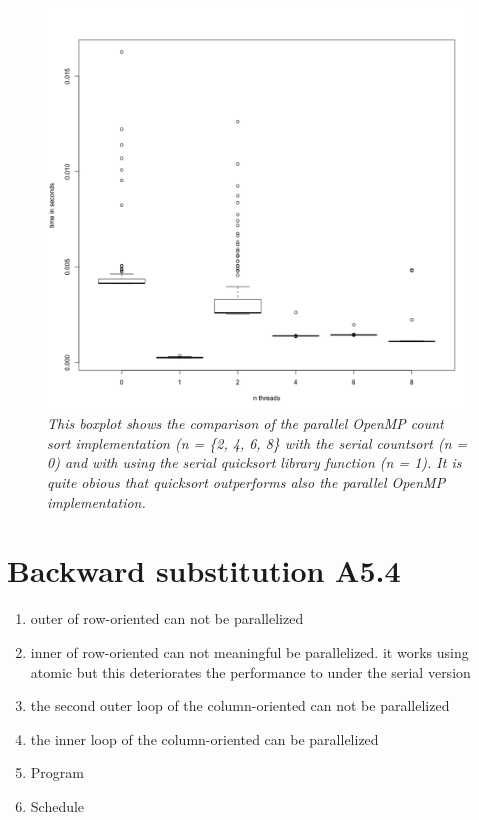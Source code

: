 \documentclass[a4paper,11pt,twoside]{article}
\begin{document}
\begin{figure}

  \centering
  \includegraphics[width=1\textwidth]{countsort.png}
  \caption{\textit{This boxplot shows the comparison of the parallel OpenMP count sort implementation (n = \{2, 4, 6, 8\} with the serial countsort (n = 0) and with using the serial quicksort library function (n = 1). It is quite obious that quicksort outperforms also the parallel OpenMP implementation.}}
  \label{fig:countsort}
\end{figure}




\section{Backward substitution A5.4}
\begin{enumerate}[label={\alph*)}]
\item outer of row-oriented can not be parallelized
\item inner of row-oriented can not meaningful be parallelized. it works using atomic but this deteriorates the performance to under the serial version
\item the second outer loop of the column-oriented can not be parallelized
\item the inner loop of the column-oriented can be parallelized
\item Program
\item Schedule
\end{enumerate}
\end{document}

